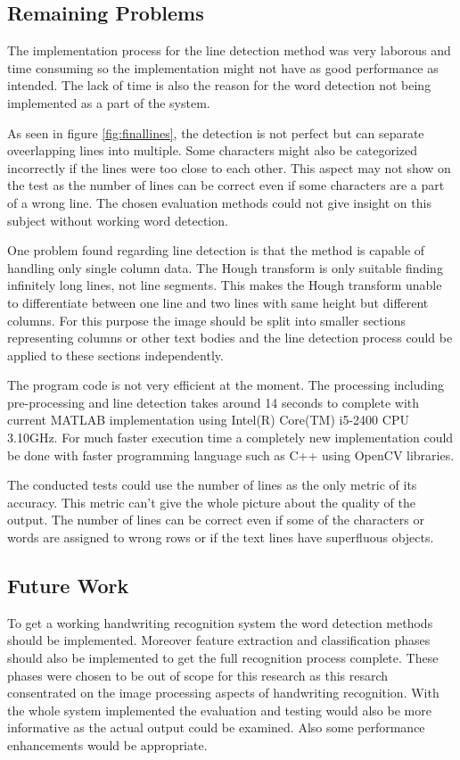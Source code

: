 \documentclass{article}
\begin{document}
    \subsection{Remaining Problems}
      The implementation process for the line detection method was very laborous and time consuming so the implementation might not have as good performance as intended. The lack of time is also the reason for the word detection not being implemented as a part of the system.

      As seen in figure \ref{fig:finallines}, the detection is not perfect but can separate oveerlapping lines into multiple. Some characters might also be categorized incorrectly if the lines were too close to each other. This aspect may not show on the test as the number of lines can be correct even if some characters are a part of a wrong line. The chosen evaluation methods could not give insight on this subject without working word detection.

      One problem found regarding line detection is that the method is capable of handling only single column data. The Hough transform is only suitable finding infinitely long lines, not line segments. This makes the Hough transform unable to differentiate between one line and two lines with same height but different columns. For this purpose the image should be split into smaller sections representing columns or other text bodies and the line detection process could be applied to these sections independently.

      The program code is not very efficient at the moment. The processing including pre-processing and line detection takes around 14 seconds to complete with current MATLAB implementation using Intel(R) Core(TM) i5-2400 CPU 3.10GHz. For much faster execution time a completely new implementation could be done with faster programming language such as C++ using OpenCV libraries.

      The conducted tests could use the number of lines as the only metric of its accuracy. This metric can't give the whole picture about the quality of the output. The number of lines can be correct even if some of the characters or words are assigned to wrong rows or if the text lines have superfluous objects.

    \subsection{Future Work}
      To get a working handwriting recognition system the word detection methods should be implemented. Moreover feature extraction and classification phases should also be implemented to get the full recognition process complete. These phases were chosen to be out of scope for this research as this resarch consentrated on the image processing aspects of handwriting recognition. With the whole system implemented the evaluation and testing would also be more informative as the actual output could be examined. Also some performance enhancements would be appropriate.

  \newpage
  
  
\end{document}
